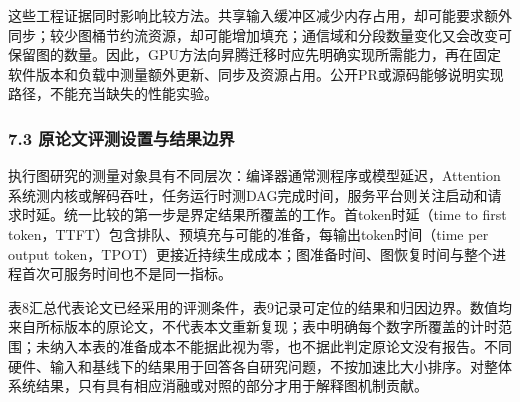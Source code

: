 \documentclass[UTF8,11pt,fontset=windows]{ctexart}
\begin{document}
这些工程证据同时影响比较方法。共享输入缓冲区减少内存占用，却可能要求额外同步；较少图桶节约流资源，却可能增加填充；通信域和分段数量变化又会改变可保留图的数量。因此，GPU方法向昇腾迁移时应先明确实现所需能力，再在固定软件版本和负载中测量额外更新、同步及资源占用。公开PR或源码能够说明实现路径，不能充当缺失的性能实验。

\hypertarget{section-7-3}{%
\subsubsection{7.3 原论文评测设置与结果边界}\label{section-7-3}}

执行图研究的测量对象具有不同层次：编译器通常测程序或模型延迟，Attention系统测内核或解码吞吐，任务运行时测DAG完成时间，服务平台则关注启动和请求时延。统一比较的第一步是界定结果所覆盖的工作。首token时延（time to first token，TTFT）包含排队、预填充与可能的准备，每输出token时间（time per output token，TPOT）更接近持续生成成本；图准备时间、图恢复时间与整个进程首次可服务时间也不是同一指标。

表8汇总代表论文已经采用的评测条件，表9记录可定位的结果和归因边界。数值均来自所标版本的原论文，不代表本文重新复现；表中明确每个数字所覆盖的计时范围；未纳入本表的准备成本不能据此视为零，也不据此判定原论文没有报告。不同硬件、输入和基线下的结果用于回答各自研究问题，不按加速比大小排序。对整体系统结果，只有具有相应消融或对照的部分才用于解释图机制贡献。
\end{document}
